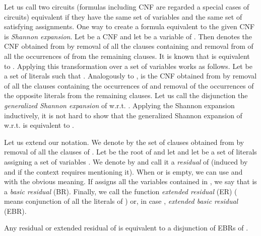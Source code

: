 \documentclass{llncs}
\begin{document}
\begin{comment}
Let  be the root of  and let  and let
 be a set of literals assigning a set of variables . We denote by
 the CNF obtained from  by removal of clauses of  and assigning the literals of  to 
(i.e. taking the residual CNF resulting from the assignment). When  or  is empty, we can use
 and  with the obvious meaning. We call  a \emph{residual} of  
(induced by  and  if the context requires mentioning it). If
 assigns all the variables contained in , we say that  is a \emph{basic residual} (BR).
Finally, we call the function  \emph{extended residual} (ER) (
means conjunction of all the literals of ) or, in case , \emph{extended basic residual} (EBR).
\end{comment}

Let us call two circuits (formulas including CNF are regarded a special cases of circuits)
equivalent if they have the same set of variables and the same set of satisfying assignments.
One way to create a formula equivalent to the given CNF is \emph{Shannon expansion}. Let 
be a CNF and let  be a variable of . Then  denotes the CNF obtained from  by removal
of all the clauses containing  and removal from of all the occurrences of  from the 
remaining clauses. It is known that  is equivalent to . Applying this 
transformation over a set  of variables works as follows. Let  be a set of literals such
that . Analogously to ,  is the CNF obtained from  by removal of all the
clauses containing the occurrences of  and removal of the occurrences of the opposite literals
from the remaining clauses. Let us call the disjunction  the
\emph{generalized Shannon expansion} of  w.r.t. . Applying the Shannon expansion inductively, it is
not hard to show that the generalized Shannon expansion of  w.r.t.  is equivalent to .

Let us extend our notation. We denote by  the set of clauses obtained from
 by removal of all the clauses of . Let  be the root of  and let  and let
 be a set of literals assigning a set of variables .
We denote  by  and call it a \emph{residual} of 
 (induced by  and  if the context requires mentioning it).
When  or  is empty, we can use  and  with the obvious meaning.
If  assigns all the variables contained in , we say that  is a \emph{basic residual} (BR).
Finally, we call the function  \emph{extended residual} (ER) (
means conjunction of all the literals of ) or, in case , \emph{extended basic residual} (EBR).

\begin{lemma} \label{localdisj}
Any residual or extended residual of  is equivalent to a disjunction of EBRs of . 
\end{lemma}
 
\end{document}
